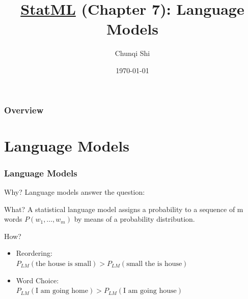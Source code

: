 \documentclass{beamer}
\title[Language Model]{\href{http://www.statmt.org/book/}{StatML}
  (Chapter 7): Language Models} %
\author{Chunqi Shi} %
\institute[QQ:86350181]
{
\medskip
\textit{chunqi.shi@hotmail.com} %
}
\date{\today} %
\begin{document}
\begin{frame}
\titlepage %
\end{frame}

\begin{frame}
\frametitle{Overview} %
\tableofcontents %
\end{frame}


\section{Language Models}



\begin{frame}\frametitle{Language Models}


\begin{block}{Why?}
Language models answer the question: \\
\end{block}

\begin{block}{What?}
A statistical language model assigns a \alert{probability} to a sequence of m
words $P(w_1,\ldots,w_m)$ by means of a probability distribution.
\end{block}

\begin{block}{How?}

\begin{itemize}
\item Reordering: \\ \quad  $P_{LM}(\text{the house is small}) > P_{LM}(\text{small the is house})$
\item Word Choice: \\ \quad $P_{LM}(\text{I am going home}) > P_{LM}(\text{I am going house})$
\end{itemize}

\end{block}

\end{frame}
\end{document}
